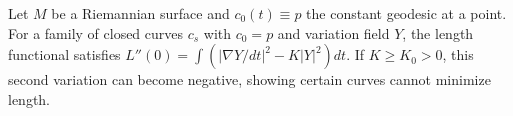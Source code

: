 Let $M$ be a Riemannian surface and $c_0(t) \equiv p$ the constant geodesic at a point. For a family of closed curves $c_s$ with $c_0 = p$ and variation field $Y$, the length functional satisfies $L''(0) = \int (|\nabla Y/dt|^2 - K|Y|^2) dt$. If $K \geq K_0 > 0$, this second variation can become negative, showing certain curves cannot minimize length.